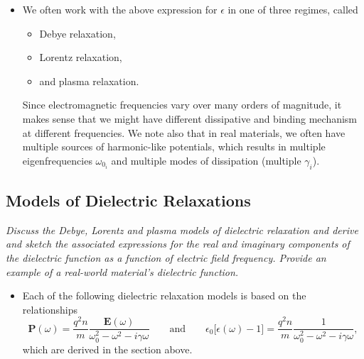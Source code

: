 \documentclass[11pt, a4paper]{article}
\renewcommand{\vec}[1]{\bm{#1}} %
\newcommand{\E}{\vec{E}} %
\renewcommand{\P}{\vec{P}}  %
\newcommand{\ee}{\epsilon_{0}}  %
\begin{document}
\begin{itemize}
    \item We often work with the above expression for $ \epsilon $ in one of three regimes, called
    \begin{itemize}
        \item Debye relaxation,

        \item Lorentz relaxation,

        \item and plasma relaxation.
    \end{itemize}
    Since electromagnetic frequencies vary over many orders of magnitude, it makes sense that we might have different dissipative and binding mechanism at different frequencies. We note also that in real materials, we often have multiple sources of harmonic-like potentials, which results in multiple eigenfrequencies $ \omega_{0_{i}} $ and multiple modes of dissipation (multiple $ \gamma_{i} $).

\end{itemize}


\subsection{Models of Dielectric Relaxations}
\textit{Discuss the Debye, Lorentz and plasma models of dielectric relaxation and derive and sketch the associated expressions for the real and imaginary components of the dielectric function as a function of electric field frequency. Provide an example of a real-world material's dielectric function.}

\begin{itemize}
    \item Each of the following dielectric relaxation models is based on the relationships
    \begin{equation*}
        \P(\omega) = \frac{q^{2}n}{m} \frac{\E(\omega)}{\omega_{0}^{2} - \omega^{2} - i \gamma \omega} \qquad \text{and} \qquad \ee \big[ \epsilon(\omega) -1 \big] = \frac{q^{2}n}{m} \frac{1}{\omega_{0}^{2} - \omega^{2} - i\gamma\omega},
    \end{equation*}
    which are derived in the section above.

\end{itemize}
\end{document}
